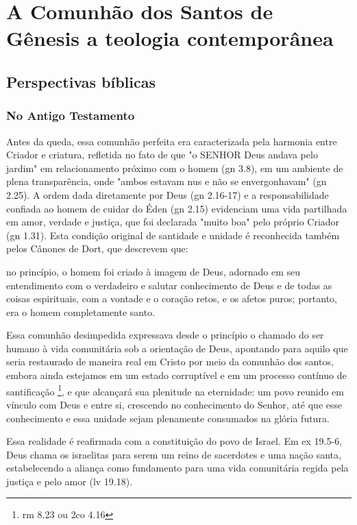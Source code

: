 \chapter{A Comunhão dos Santos de Gênesis a teologia contemporânea}

\section{Perspectivas bíblicas}

\subsection{No Antigo Testamento}

Antes da queda, essa comunhão perfeita era caracterizada pela harmonia entre Criador e criatura, refletida no fato de que "o SENHOR Deus andava pelo jardim" em relacionamento próximo com o homem (\gls{gn} 3.8), em um ambiente de plena transparência, onde "ambos estavam nus e não se envergonhavam" (\gls{gn} 2.25). A ordem dada diretamente por Deus (\gls{gn} 2.16-17) e a responsabilidade confiada ao homem de cuidar do Éden (\gls{gn} 2.15) evidenciam uma vida partilhada em amor, verdade e justiça, que foi declarada "muito boa" pelo próprio Criador (\gls{gn} 1.31). Esta condição original de santidade e unidade é reconhecida também pelos Cânones de Dort, que descrevem que:

\begin{citacao} no princípio, o homem foi criado à imagem de Deus, adornado em seu entendimento com o verdadeiro e salutar conhecimento de Deus e de todas as coisas espirituais, com a vontade e o coração retos, e os afetos puros; portanto, era o homem completamente santo.\cite{cdd}
\end{citacao}

Essa comunhão desimpedida expressava desde o princípio o chamado do ser humano à vida comunitária sob a orientação de Deus, apontando para aquilo que seria restaurado de maneira real em Cristo por meio da comunhão dos santos, embora ainda estejamos em um estado corruptível e em um processo contínuo de santificação \footnote{\gls{rm} 8.23 ou \gls{2co} 4.16}, e que alcançará sua plenitude na eternidade: um povo reunido em vínculo com Deus e entre si, crescendo no conhecimento do Senhor, até que esse conhecimento e essa unidade sejam plenamente consumados na glória futura.

Essa realidade é reafirmada com a constituição do povo de Israel. Em \gls{ex} 19.5-6, Deus chama os israelitas para serem um reino de sacerdotes e uma nação santa, estabelecendo a aliança como fundamento para uma vida comunitária regida pela justiça e pelo amor (\gls{lv} 19.18).

